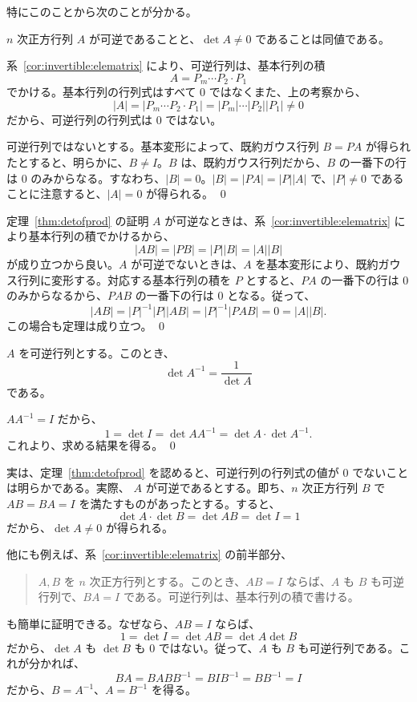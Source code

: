 \smallskip
特にこのことから次のことが分かる。

\begin{cor}
$n$ 次正方行列 $A$ が可逆であることと、$\det A\neq 0$ であることは同値である。
\end{cor}
\proof
系~\ref{cor:invertible:elematrix} により、可逆行列は、基本行列の積 
$$A = P_m\cdots P_2\cdot P_1$$
でかける。基本行列の行列式はすべて 0 ではなくまた、上の考察から、
$$|A| = |P_m\cdots P_2\cdot P_1| = |P_m|\cdots|P_2||P_1| \neq 0$$
だから、可逆行列の行列式は 0 ではない。

\smallskip
可逆行列ではないとする。基本変形によって、既約ガウス行列 $B = PA$ が得られたとすると、明らかに、$B\neq I$。$B$ は、既約ガウス行列だから、$B$ の一番下の行は 0 のみからなる。すなわち、$|B| = 0$。$|B| = |PA| = |P||A|$ で、$|P|\neq 0$ であることに注意すると、$|A| = 0$ が得られる。
\qed

\medskip
{\gt 定理~\ref{thm:detofprod} の証明 \quad}
$A$ が可逆なときは、系~\ref{cor:invertible:elematrix} により基本行列の積でかけるから、
$$|AB| = |PB| = |P||B| = |A||B|$$
が成り立つから良い。$A$ が可逆でないときは、$A$ を基本変形により、既約ガウス行列に変形する。対応する基本行列の積を $P$ とすると、$PA$ の一番下の行は 0 のみからなるから、$PAB$ の一番下の行は 0 となる。従って、
$$|AB|  =  |P|^{-1}|P||AB| =  |P|^{-1}|PAB| = 0 = |A||B|.$$
この場合も定理は成り立つ。
\qed

\begin{cor} \label{cor:detofinverse}
$A$ を可逆行列とする。このとき、
$$\det A^{-1} = \frac 1{\det A}$$
である。
\end{cor}
\proof
$AA^{-1} = I$ だから、
$$1 = \det I = \det AA^{-1} = \det A\cdot\det A^{-1}.$$
これより、求める結果を得る。
\qed

\medskip
実は、定理~\ref{thm:detofprod} を認めると、可逆行列の行列式の値が 0 でないことは明らかである。実際、
$A$  が可逆であるとする。即ち、$n$ 次正方行列 $B$ で $AB = BA = I$ を満たすものがあったとする。すると、
$$\det A\cdot\det B = \det AB = \det I = 1$$
だから、$\det A\neq 0$ が得られる。

\medskip
他にも例えば、系~\ref{cor:invertible:elematrix} の前半部分、
\begin{quote}
$A,B$ を $n$ 次正方行列とする。このとき、$AB = I$ ならば、$A$ も $B$ も可逆行列で、$BA =  I$ である。可逆行列は、基本行列の積で書ける。
\end{quote}
も簡単に証明できる。なぜなら、$AB = I$ ならば、
$$1 = \det I = \det AB = \det A\det B$$
だから、$\det A$ も $\det B$ も 0 ではない。従って、$A$ も $B$ も可逆行列である。これが分かれば、
$$BA = BABB^{-1} = BIB^{-1} = BB^{-1} = I$$
だから、$B = A^{-1}$、$A = B^{-1}$ を得る。

